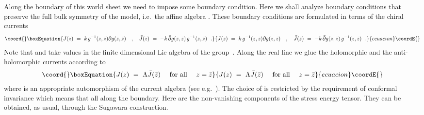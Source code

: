 \documentclass[12pt,a4paper]{article}
\providecommand{\mf}{\mathfrak} %
\def\asg{{\hat{\mf{g}}}}
\def\bz{{\bar z}}
\def\pl{\partial}
\def\bJ{{\bar J}}
\def\bpl{\bar \partial}
\def\bT{{\bar T}}
\begin{document}
Along the boundary of this world sheet we need to impose some 
boundary condition. Here we shall analyze boundary conditions 
that preserve the full bulk symmetry of the model, i.e.\ the 
affine algebra \myHighlight{$\asg_k$}\coordHE{}. These boundary conditions are formulated 
in terms of the chiral currents 
\begin{equation}\coord{}\boxEquation{
 J (z) \ = \ k \, g^{-1}(z,\bz) \pl g(z,\bz ) \ \ \  , \ \ \ 
   \bJ (\bz) \ = \ -k \, \bpl g(z,\bz ) \, g^{-1}(z,\bz)\ \ .
}{
 J (z) \ = \ k \, g^{-1}(z,\bz) \pl g(z,\bz ) \ \ \  , \ \ \ 
   \bJ (\bz) \ = \ -k \, \bpl g(z,\bz ) \, g^{-1}(z,\bz)\ \ .
}{ecuacion}\coordE{}\end{equation}
Note that \myHighlight{$J$}\coordHE{} and \myHighlight{$\bJ$}\coordHE{} take values in the finite dimensional 
Lie algebra \myHighlight{$\mf{g}$}\coordHE{} of the group~\coordHE{}. Along the real line we glue 
the holomorphic and the anti-holomorphic currents  according to 
\begin{equation}\coord{}\boxEquation{
  \label{glue}  
  J(z) \ = \ \Lambda \bJ(\bz)  \ \ \ 
  \text{ for all } \ \ \ z = \bz 
}{
  J(z) \ = \ \Lambda \bJ(\bz)  \ \ \ 
  \text{ for all } \ \ \ z = \bz 
}{ecuacion}\coordE{}\end{equation}
where \myHighlight{$\Lambda$}\coordHE{} is an appropriate automorphism of the current  
algebra \myHighlight{$\asg_k$}\coordHE{} (see e.g.\ \cite{Recknagel:1998sb}). The choice of 
\myHighlight{$\Lambda$}\coordHE{} is restricted by the requirement of conformal 
invariance which means that \myHighlight{$T(z) = \bT(\bz)$}\coordHE{} all along the 
boundary. Here \myHighlight{$T, \bT$}\coordHE{} are the non-vanishing components
of the stress energy tensor. They can be obtained, as usual,
through the Sugawara construction.
\smallskip
\end{document}
